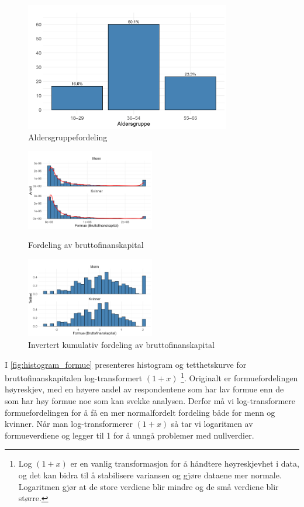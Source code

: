 \documentclass[
  12pt,
  a4paper,
  DIV=11,
  numbers=noendperiod]{scrartcl}
\begin{document}
\begin{figure}[H]
\caption{Aldersgruppefordeling}
\label{fig:barplot}
\centering
\includegraphics[width=0.8\textwidth]{dokumentobjekter/figurer/fig_3.png}
\end{figure}

\clearpage

\begin{figure} 
    \centering
    \includegraphics[width=0.5\textwidth]{dokumentobjekter/figurer/fig_4_1.png}
    \caption{Fordeling av bruttofinanskapital}
    \label{fig:histogram_formue}
    \smallskip\par
    \includegraphics[width=0.5\textwidth]{dokumentobjekter/figurer/fig_4_2.png}
    \caption{Invertert kumulativ fordeling av bruttofinanskapital}
    \label{fig:histogram_formue_fordeling}
\end{figure}

I \autoref{fig:histogram_formue} presenteres histogram og tetthetskurve
for bruttofinanskapitalen log-transformert \((1 + x)\) \footnote{Log
  \((1 + x)\) er en vanlig transformasjon for å håndtere høyreskjevhet i
  data, og det kan bidra til å stabilisere variansen og gjøre dataene
  mer normale. Logaritmen gjør at de store verdiene blir mindre og de
  små verdiene blir større.}. Originalt er formuefordelingen høyreskjev,
med en høyere andel av respondentene som har lav formue enn de som har
høy formue noe som kan svekke analysen. Derfor må vi log-transformere
formuefordelingen for å få en mer normalfordelt fordeling både for menn
og kvinner. Når man log-transformerer \((1 + x)\) så tar vi logaritmen
av formueverdiene og legger til 1 for å unngå problemer med nullverdier.
\end{document}
